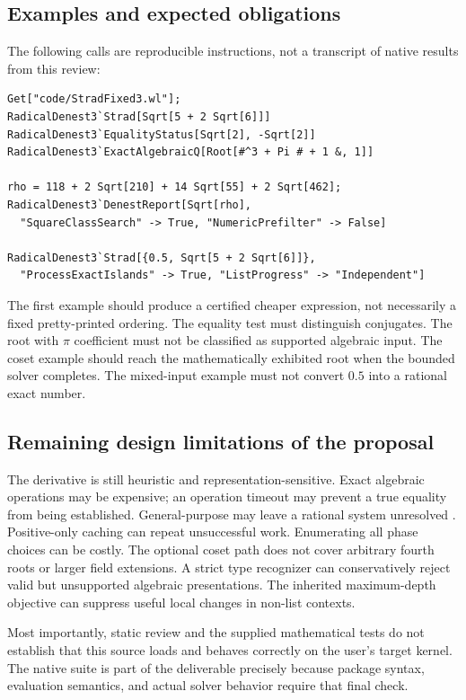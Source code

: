 \documentclass[11pt,letterpaper]{article}
\numberwithin{equation}{section}
\theoremstyle{definition}\newtheorem{definition}[theorem]{Definition}
\theoremstyle{remark}\newtheorem{remark}[theorem]{Remark}
\newcommand{\code}[1]{\texttt{\detokenize{#1}}}
\begin{document}
\subsection{Examples and expected obligations}
The following calls are reproducible instructions, not a transcript of native results from this review:
\begin{lstlisting}
Get["code/StradFixed3.wl"];
RadicalDenest3`Strad[Sqrt[5 + 2 Sqrt[6]]]
RadicalDenest3`EqualityStatus[Sqrt[2], -Sqrt[2]]
RadicalDenest3`ExactAlgebraicQ[Root[#^3 + Pi # + 1 &, 1]]

rho = 118 + 2 Sqrt[210] + 14 Sqrt[55] + 2 Sqrt[462];
RadicalDenest3`DenestReport[Sqrt[rho],
  "SquareClassSearch" -> True, "NumericPrefilter" -> False]

RadicalDenest3`Strad[{0.5, Sqrt[5 + 2 Sqrt[6]]},
  "ProcessExactIslands" -> True, "ListProgress" -> "Independent"]
\end{lstlisting}
The first example should produce a certified cheaper expression, not necessarily a fixed pretty-printed ordering. The equality test must distinguish conjugates. The root with $\pi$ coefficient must not be classified as supported algebraic input. The coset example should reach the mathematically exhibited root when the bounded solver completes. The mixed-input example must not convert $0.5$ into a rational exact number.

\subsection{Remaining design limitations of the proposal}
The derivative is still heuristic and representation-sensitive. Exact algebraic operations may be expensive; an operation timeout may prevent a true equality from being established. General-purpose \code{Solve} may leave a rational system unresolved \cite{wl-solve}. Positive-only caching can repeat unsuccessful work. Enumerating all phase choices can be costly. The optional coset path does not cover arbitrary fourth roots or larger field extensions. A strict type recognizer can conservatively reject valid but unsupported algebraic presentations. The inherited maximum-depth objective can suppress useful local changes in non-list contexts.

Most importantly, static review and the supplied mathematical tests do not establish that this source loads and behaves correctly on the user's target kernel. The native suite is part of the deliverable precisely because package syntax, evaluation semantics, and actual solver behavior require that final check.
\end{document}

